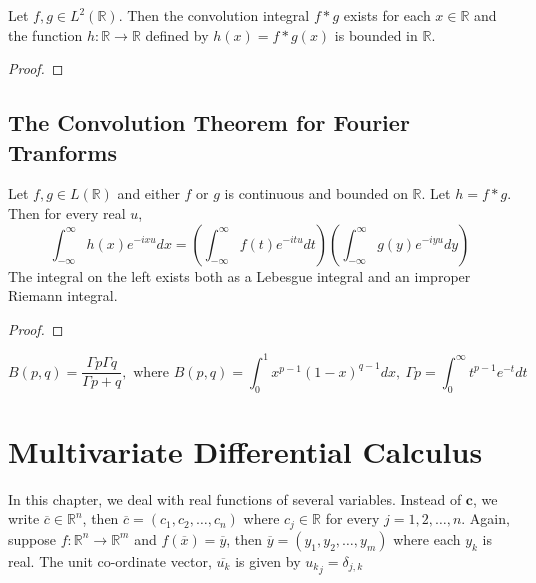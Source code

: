 \begin{theorem}
	Let \( f,g \in L^2(\mathbb{R}) \). Then the convolution integral $f \ast g$ exists for each \( x \in \mathbb{R} \) and the function \( h : \mathbb{R} \to \mathbb{R} \) defined by \( h(x) = f \ast g (x) \) is bounded in $\mathbb{R}$.
\end{theorem}
\begin{synopsis}
\end{synopsis}
\begin{proof}
\end{proof}

\section{The Convolution Theorem for Fourier Tranforms}
\begin{theorem}
	Let \( f,g \in L(\mathbb{R}) \) and either $f$ or $g$ is continuous and bounded on $\mathbb{R}$. Let \( h = f \ast g \). Then for every real $u$,
	\[ \int_{-\infty}^\infty h(x) e^{-ixu} dx = \left( \int_{-\infty}^\infty f(t) e^{-itu} dt \right) \left( \int_{-\infty}^\infty g(y) e^{-iyu} dy \right) \]
	The integral on the left exists both as a Lebesgue integral and an improper Riemann integral.
\end{theorem}
\begin{synopsis}
\end{synopsis}
\begin{proof}
\end{proof}

\begin{remark}
	\[ B(p,q) = \frac{\Gamma{p} \Gamma{q}}{\Gamma{p+q}},\text{ where } B(p,q) = \int_0^1 x^{p-1} (1-x)^{q-1} dx,\ \Gamma{p} = \int_0^\infty t^{p-1} e^{-t} dt \]
\end{remark}

\chapter{Multivariate Differential Calculus}

	In this chapter, we deal with real functions of several variables. Instead of $\mathbf{c}$, we write \( \overline{c} \in \mathbb{R}^n \), then \( \overline{c} = (c_1, c_2, \dotsc, c_n) \) where \( c_j \in \mathbb{R} \) for every \(j = 1,2, \dotsc, n\). Again, suppose \(f : \mathbb{R}^n \to \mathbb{R}^m\) and \(f(\overline{x}) = \overline{y}\), then \(\overline{y} = (y_1, y_2, \dotsc, y_m)\) where each $y_k$ is real. The unit co-ordinate vector, $\overline{u_k}$ is given by \( {u_k}_j = \delta_{j,k} \)

